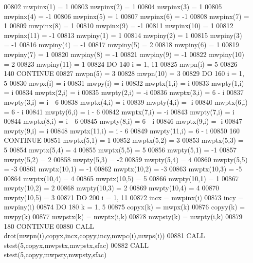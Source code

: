 \begin{DoxyCode}
00802       mwpinx(1) = 1
00803       mwpinx(2) = 1
00804       mwpinx(3) = 1
00805       mwpinx(4) = -1
00806       mwpinx(5) = 1
00807       mwpinx(6) = -1
00808       mwpinx(7) = 1
00809       mwpinx(8) = 1
00810       mwpinx(9) = -1
00811       mwpinx(10) = 1
00812       mwpinx(11) = -1
00813       mwpiny(1) = 1
00814       mwpiny(2) = 1
00815       mwpiny(3) = -1
00816       mwpiny(4) = -1
00817       mwpiny(5) = 2
00818       mwpiny(6) = 1
00819       mwpiny(7) = 1
00820       mwpiny(8) = -1
00821       mwpiny(9) = -1
00822       mwpiny(10) = 2
00823       mwpiny(11) = 1
00824       \textcolor{keywordflow}{DO} 140 i = 1, 11
00825          mwpn(i) = 5
00826   140 \textcolor{keywordflow}{CONTINUE}
00827       mwpn(5) = 3
00828       mwpn(10) = 3
00829       \textcolor{keywordflow}{DO} 160 i = 1, 5
00830          mwpx(i) = i
00831          mwpy(i) = i
00832          mwptx(1,i) = i
00833          mwpty(1,i) = i
00834          mwptx(2,i) = i
00835          mwpty(2,i) = -i
00836          mwptx(3,i) = 6 - i
00837          mwpty(3,i) = i - 6
00838          mwptx(4,i) = i
00839          mwpty(4,i) = -i
00840          mwptx(6,i) = 6 - i
00841          mwpty(6,i) = i - 6
00842          mwptx(7,i) = -i
00843          mwpty(7,i) = i
00844          mwptx(8,i) = i - 6
00845          mwpty(8,i) = 6 - i
00846          mwptx(9,i) = -i
00847          mwpty(9,i) = i
00848          mwptx(11,i) = i - 6
00849          mwpty(11,i) = 6 - i
00850   160 \textcolor{keywordflow}{CONTINUE}
00851       mwptx(5,1) = 1
00852       mwptx(5,2) = 3
00853       mwptx(5,3) = 5
00854       mwptx(5,4) = 4
00855       mwptx(5,5) = 5
00856       mwpty(5,1) = -1
00857       mwpty(5,2) = 2
00858       mwpty(5,3) = -2
00859       mwpty(5,4) = 4
00860       mwpty(5,5) = -3
00861       mwptx(10,1) = -1
00862       mwptx(10,2) = -3
00863       mwptx(10,3) = -5
00864       mwptx(10,4) = 4
00865       mwptx(10,5) = 5
00866       mwpty(10,1) = 1
00867       mwpty(10,2) = 2
00868       mwpty(10,3) = 2
00869       mwpty(10,4) = 4
00870       mwpty(10,5) = 3
00871       \textcolor{keywordflow}{DO} 200 i = 1, 11
00872          incx = mwpinx(i)
00873          incy = mwpiny(i)
00874          \textcolor{keywordflow}{DO} 180 k = 1, 5
00875             copyx(k) = mwpx(k)
00876             copyy(k) = mwpy(k)
00877             mwpstx(k) = mwptx(i,k)
00878             mwpsty(k) = mwpty(i,k)
00879   180    \textcolor{keywordflow}{CONTINUE}
00880          \textcolor{keyword}{CALL }drot(mwpn(i),copyx,incx,copyy,incy,mwpc(i),mwps(i))
00881          \textcolor{keyword}{CALL }stest(5,copyx,mwpstx,mwpstx,sfac)
00882          \textcolor{keyword}{CALL }stest(5,copyy,mwpsty,mwpsty,sfac)

\end{DoxyCode}
